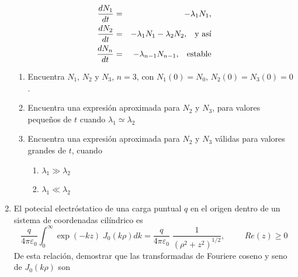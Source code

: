 \begin{enumerate}
\begin{eqnarray*}
\dfrac{d N_{1}}{dt} &=& - \lambda_{1} N_{1}, \nonumber \\
\dfrac{d N_{2}}{dt} &=& - \lambda_{1} N_{1} - \lambda_{2} N_{2}, \hspace{0.3cm} \mbox{y así} \nonumber \\
\dfrac{d N_{n}}{dt} &=& - \lambda_{n-1} N_{n-1}, \hspace{0.3cm} \mbox{estable} \nonumber
\end{eqnarray*} 
\begin{enumerate}[label=\alph*)]
\item Encuentra $N_{1}$, $N_{2}$ y $N_{3}$, $n=3$, con $N_{1}(0)=N_{0}$, $N_{2}(0)=N_{3}(0) =0$.
\item Encuentra una expresión aproximada para $N_{2}$ y $N_{3}$, para valores pequeños de $t$ cuando $\lambda_{1} \simeq \lambda_{2}$
\item Encuentra una expresión aproximada para $N_{2}$ y $N_{3}$ válidas para valores grandes de $t$, cuando
\begin{enumerate}[label=\roman*)]
\item $\lambda_{1} \gg \lambda_{2}$
\item $\lambda_{1} \ll \lambda_{2}$
\end{enumerate}
\end{enumerate}
\item El potecial electróstatico de una carga puntual $q$ en el origen dentro de un sistema de coordenadas cilíndrico es
\[ \dfrac{q}{4 \pi \varepsilon_{0}} \int_{0}^{\infty} \exp(-kz) \; J_{0}(k \rho) dk = \dfrac{q}{4 \pi \varepsilon_{0}}  \;\dfrac{1}{(\rho^{2} + z^{2})^{1/2}}, \hspace{1cm} Re(z) \geq 0\]
De esta relación, demostrar que las transformadas de Fouriere coseno y seno de $J_{0}(k \rho)$ son
\end{enumerate}
